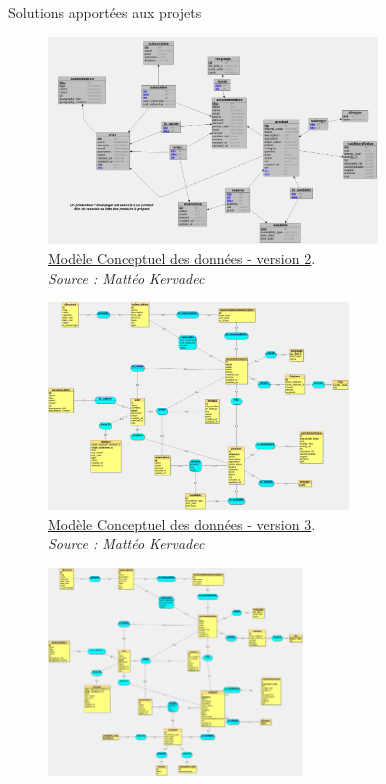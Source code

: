 \documentclass{beamer}
\begin{document}
\begin{frame}[label=realisation]{Solutions apportées aux projets}
\begin{center}
{\begin{figure}[t]
{				}
  				\label{fig:mcdV1}
  			\end{figure}
		}
		 {
			\addtocounter{figure}{1}
			\begin{figure}[t]
  				\includegraphics[height=5.5cm]{../img/conception/mcd_V2.jpg}
				\caption{	
					\centering			
  					\href{https://github.com/Matteo-K/Soutenance_E-delic/blob/main/img/conception/mcd_V2.jpg}{\underline{Modèle Conceptuel des données - version 2}}.\\
  					\textit{Source : Mattéo Kervadec}
				}
  				\label{fig:mcdV2}
  			\end{figure}
		}
		\only<4> {
			\addtocounter{figure}{2}
			\begin{figure}[t]
  				\includegraphics[height=5.5cm]{../img/conception/mcd_V3.jpg}
				\caption{	
					\centering			
  					\href{https://github.com/Matteo-K/Soutenance_E-delic/blob/main/img/conception/mcd_V3.jpg}{\underline{Modèle Conceptuel des données - version 3}}.\\
  					\textit{Source : Mattéo Kervadec}
				}
  				\label{fig:mcdV3}
  			\end{figure}
		}
		\only<5> {
			\addtocounter{figure}{3}
			\begin{figure}[t]
  				\includegraphics[height=5.5cm]{../img/conception/mcd_V4.jpg}

\end{figure}}
\end{center}
\end{frame}
\end{document}
